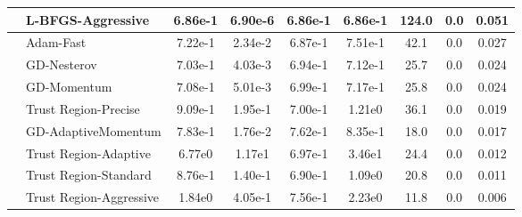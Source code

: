\documentclass[10pt]{article}
\begin{document}
\begin{longtable}{|l|l|c|c|c|c|c|c|c|}
\hline
 & L-BFGS-Aggressive & 6.86e-1 & 6.90e-6 & 6.86e-1 & 6.86e-1 & 124.0 & 0.0 & 0.051 \\
\hline
 & Adam-Fast & 7.22e-1 & 2.34e-2 & 6.87e-1 & 7.51e-1 & 42.1 & 0.0 & 0.027 \\
\hline
 & GD-Nesterov & 7.03e-1 & 4.03e-3 & 6.94e-1 & 7.12e-1 & 25.7 & 0.0 & 0.024 \\
\hline
 & GD-Momentum & 7.08e-1 & 5.01e-3 & 6.99e-1 & 7.17e-1 & 25.8 & 0.0 & 0.024 \\
\hline
 & Trust Region-Precise & 9.09e-1 & 1.95e-1 & 7.00e-1 & 1.21e0 & 36.1 & 0.0 & 0.019 \\
\hline
 & GD-AdaptiveMomentum & 7.83e-1 & 1.76e-2 & 7.62e-1 & 8.35e-1 & 18.0 & 0.0 & 0.017 \\
\hline
 & Trust Region-Adaptive & 6.77e0 & 1.17e1 & 6.97e-1 & 3.46e1 & 24.4 & 0.0 & 0.012 \\
\hline
 & Trust Region-Standard & 8.76e-1 & 1.40e-1 & 6.90e-1 & 1.09e0 & 20.8 & 0.0 & 0.011 \\
\hline
 & Trust Region-Aggressive & 1.84e0 & 4.05e-1 & 7.56e-1 & 2.23e0 & 11.8 & 0.0 & 0.006 \\
\end{longtable}
\end{document}
